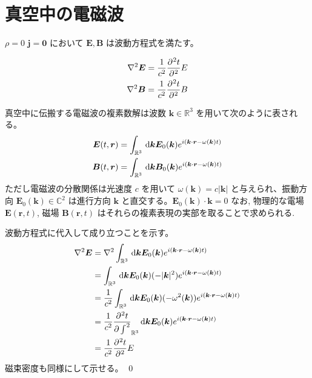 \documentclass[uplatex,dvipdfmx,a4paper,11pt]{jlreq}
\makeatletter
\newcommand{\CC}{\mathbb{C}}
\newcommand{\RR}{\mathbb{R}}
\newcommand{\EE}{\bm{E}}
\newcommand{\BB}{\bm{B}}
\newcommand{\rr}{\bm{r}}
\newcommand{\kk}{\bm{k}}
\theoremstyle{definition}
\renewenvironment{proof}[1][\proofname]{\par
  \normalfont
  \topsep6\p@\@plus6\p@ \trivlist
  \item[\hskip\labelsep{\bfseries #1}\@addpunct{\bfseries}]\ignorespaces\quad\par
}{%
  \qed\endtrivlist\@endpefalse
}
\renewcommand\proofname{証明}
\makeatother
\begin{document}
\begin{proposition}[極座標で表した電気双極子]
\end{proposition}

\begin{proposition}[電気四重極子]

\end{proposition}

\begin{proposition}[電気双極子放射]

\end{proposition}


\section{真空中の電磁波}

\begin{proposition}
  $\rho = 0$ $\bm{j} = \bm{0}$ において $\EE, \BB$ は波動方程式を満たす。
\end{proposition}
\begin{align}
  \nabla^2\EE = \frac{1}{c^2}\diffp[2]{t}\EE \\
  \nabla^2\BB = \frac{1}{c^2}\diffp[2]{t}\BB
\end{align}

\begin{theorem}[]
  真空中に伝搬する電磁波の複素数解は波数 $\kk\in\RR^3$ を用いて次のように表される。
  \begin{align}
    \EE(t, \rr) & = \int_{\RR^3}\dl{\kk}\EE_0(\kk)e^{i(\kk\cdot\rr - \omega(\kk)t)} \\
    \BB(t, \rr) & = \int_{\RR^3}\dl{\kk}\BB_0(\kk)e^{i(\kk\cdot\rr - \omega(\kk)t)}
  \end{align}
  ただし電磁波の分散関係は光速度 $c$ を用いて $\omega(\kk) = c|\kk|$ と与えられ、振動方向 $\EE_0(\kk)\in\CC^2$ は進行方向 $\kk$ と直交する。$\EE_0(\kk)\cdot\kk = 0$
  なお, 物理的な電場 $\EE(\rr, t)$, 磁場 $\BB(\rr, t)$ はそれらの複素表現の実部を取ることで求められる.
\end{theorem}
\begin{proof}
  波動方程式に代入して成り立つことを示す。
  \begin{align}
    \nabla^2\EE & = \nabla^2\int_{\RR^3}\dl{\kk}\EE_0(\kk)e^{i(\kk\cdot\rr - \omega(\kk)t)}                      \\
                & = \int_{\RR^3}\dl{\kk}\EE_0(\kk)(-|\kk|^2)e^{i(\kk\cdot\rr - \omega(\kk)t)}                    \\
                & = \frac{1}{c^2}\int_{\RR^3}\dl{\kk}\EE_0(\kk)(-\omega^2(\kk))e^{i(\kk\cdot\rr - \omega(\kk)t)} \\
                & = \frac{1}{c^2}\diffp[2]{t}\int_{\RR^3}\dl{\kk}\EE_0(\kk)e^{i(\kk\cdot\rr - \omega(\kk)t)}     \\
                & = \frac{1}{c^2}\diffp[2]{t}\EE
  \end{align}
  磁束密度も同様にして示せる。
\end{proof}
\end{document}
